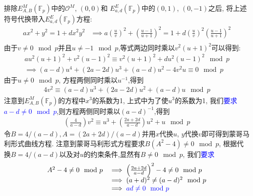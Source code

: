 \documentclass{article}
\newcommand{\F}{\mathbb{F}}
\newcommand{\blue}{\textcolor{blue}}
\begin{document}
排除$E_{A,B}^M(\F_p)$中的$\mathcal{O}^M$, $(0,0)$和
$E_{a,d}^E(\F_p)$中的$(0,1)$, $(0,-1)$之后, 将上述符号代换带入$E_{a,d}^E(\F_p)$方程:
\begin{equation*}
\begin{array}{rl}
ax^2 + y^2 = 1 + dx^2y^2 & \implies  a\left(\frac{u}{v}\right)^2 + \left(\frac{u-1}{u+1}\right)^2 = 1 + d\left(\frac{u}{v}\right)^2\left(\frac{u-1}{u+1}\right)^2\\
\end{array}
\end{equation*}
由于$v \neq 0 \mod p$并且$u\neq -1 \mod p$,等式两边同时乘以$v^2(u+1)^2$可以得到:
\begin{equation*}
\begin{array}{rl}
au^2(u+1)^2 + v^2(u-1)^2 \equiv v^2(u+1)^2 + du^2(u-1)^2 \mod p\\
\implies  (a-d)u^4 + (2a-2d)u^3 + (a-d)u^2 - 4v^2u \equiv 0 \mod p
\end{array}
\end{equation*}
由于$u\neq 0\mod p$, 方程两侧同时乘以$u^{-1}$,得到
\begin{equation*}
\begin{array}{rl}
4v^2 \equiv (a-d)u^3 + (2a-2d)u^2 + (a-d)u \mod p
\end{array}
\end{equation*}
注意到$E_{A,B}^M(\F_p)$的方程中$x^3$的系数为1, 上式中为了使$u^3$的系数为1,
我们\blue{要求$a-d \neq 0\mod p$},则方程两侧同时乘以$(a-d)^{-1}$,得到
\begin{equation*}
\begin{array}{rl}
\left(\frac{4}{a-d}\right)v^2 \equiv u^3 + \left(\frac{2a+2d}{a-d}\right)u^2 + u \mod p
\end{array}
\end{equation*}
令$B = 4/(a-d), A = (2a+2d)/(a-d)$并用$x$代换$u$, $y$代换$v$即可得到蒙哥马利形式曲线方程.
注意到蒙哥马利形式方程要求$B(A^2-4)\neq 0 \mod p$,
根据代换$B = 4/(a-d)$以及对$u$的约束条件,显然有$B\neq0\mod p$, 我们\blue{要求
\begin{equation*}
\begin{array}{rl}
A^2-4 \neq 0\mod p & \implies \left(\frac{2a+2d}{a-d}\right)^2 - 4 \neq 0\mod p\\
& \implies (a+d)^2 \neq (a-d)^2 \mod p \\
& \implies \blue{ad \neq 0 \mod p}
\end{array}
\end{equation*}}
\end{document}
